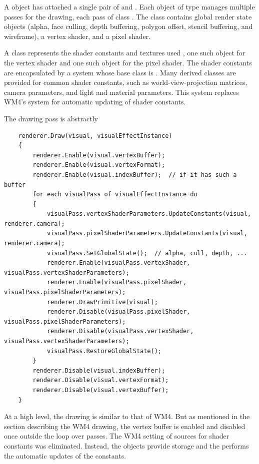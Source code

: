 \documentclass{article}
\begin{document}
A  object has attached a single pair of 
and .  Each object of type 
manages multiple passes for the drawing, each pass of class .
The  class contains global render state objects (alpha,
face culling, depth buffering, polygon offset, stencil buffering, and
wireframe), a vertex shader, and a pixel shader.

A class  represents the shader constants and
textures used , one such object for the
vertex shader and one such object for the pixel shader.  The shader
constants are encapsulated by a system whose base class is .
Many derived classes are provided for common shader constants, such as
world-view-projection matrices, camera parameters, and light and material
parameters.  This system replaces WM4's  system for
automatic updating of shader constants.

The drawing pass is abstractly

\scriptsize
\begin{verbatim}
    renderer.Draw(visual, visualEffectInstance)
    {
        renderer.Enable(visual.vertexBuffer);
        renderer.Enable(visual.vertexFormat);
        renderer.Enable(visual.indexBuffer);  // if it has such a buffer
        for each visualPass of visualEffectInstance do
        {
            visualPass.vertexShaderParameters.UpdateConstants(visual, renderer.camera);
            visualPass.pixelShaderParameters.UpdateConstants(visual, renderer.camera);
            visualPass.SetGlobalState();  // alpha, cull, depth, ...
            renderer.Enable(visualPass.vertexShader, visualPass.vertexShaderParameters);
            renderer.Enable(visualPass.pixelShader, visualPass.pixelShaderParameters);
            renderer.DrawPrimitive(visual);
            renderer.Disable(visualPass.pixelShader, visualPass.pixelShaderParameters);
            renderer.Disable(visualPass.vertexShader, visualPass.vertexShaderParameters);
            visualPass.RestoreGlobalState();
        }
        renderer.Disable(visual.indexBuffer);
        renderer.Disable(visual.vertexFormat);
        renderer.Disable(visual.vertexBuffer);
    }
\end{verbatim}
\normalsize

At a high level, the drawing is similar to that of WM4.  But as mentioned in the
section describing the WM4 drawing, the vertex buffer is enabled and disabled once
outside the loop over passes.  The WM4 setting of sources for shader constants was
eliminated.  Instead, the  objects provide storage and the
 performs the automatic updates of the constants.
\end{document}
